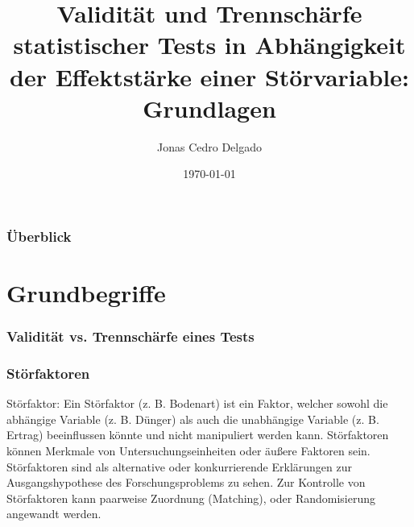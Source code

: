 \documentclass{beamer}
\title[Copulas]{Validität und Trennschärfe statistischer Tests in Abhängigkeit der Effektstärke einer Störvariable: Grundlagen} %
\author{Jonas Cedro Delgado} %
\institute[Georg-August-Universität Göttingen] %
{
Georg-August-Universität Göttingen \\ %
\medskip

}
\date{\today} %
\begin{document}
\begin{frame}
\titlepage %
\end{frame}

\begin{frame}
\frametitle{Überblick} %
\tableofcontents %
\end{frame}



\section{Grundbegriffe}
\frame{\sectionpage}


\begin{frame}
\frametitle{Validität vs. Trennschärfe eines Tests}

\end{frame}

\begin{frame}
\frametitle{Störfaktoren}
\begin{exampleblock}{Störfaktor:}
Ein Störfaktor (z. B. Bodenart) ist ein Faktor, welcher sowohl die abhängige Variable (z. B. Dünger) als auch die unabhängige Variable (z. B. Ertrag) beeinflussen könnte und nicht manipuliert werden kann. Störfaktoren können Merkmale von Untersuchungseinheiten oder äußere Faktoren sein. Störfaktoren sind als alternative oder konkurrierende Erklärungen zur Ausgangshypothese des Forschungsproblems zu sehen. Zur Kontrolle von Störfaktoren kann paarweise Zuordnung (Matching), oder Randomisierung angewandt werden.
\end{exampleblock}
\end{frame}
\end{document}
